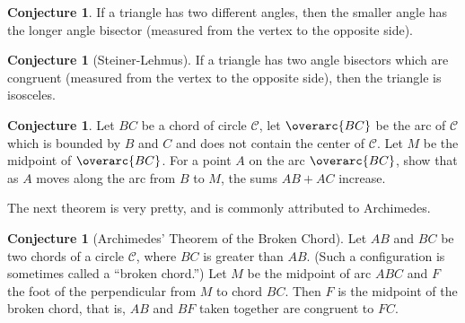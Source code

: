 \documentclass{tufte-handout}
\theoremstyle{definition}
\newtheorem{conjecture}[problem]{Conjecture}
\begin{document}
\begin{conjecture}
If a triangle has two different angles, then the smaller angle has the longer angle bisector (measured from the vertex to the opposite side).
\end{conjecture}

\begin{conjecture}[Steiner-Lehmus]
If a triangle has two angle bisectors which are congruent (measured from the vertex to the opposite side), then the triangle is isosceles.
\end{conjecture}

\begin{conjecture}
Let $BC$ be a chord of circle $\mathcal{C}$, let $\overarc{BC}$ be the arc of $\mathcal{C}$ which is bounded by $B$ and $C$ and does not contain the center of $\mathcal{C}$.
Let $M$ be the midpoint of $\overarc{BC}$.
For a point $A$ on the arc $\overarc{BC}$, show that as $A$ moves along the arc from $B$ to $M$, the sums $AB+AC$ increase.
\end{conjecture}


The next theorem is very pretty, and is commonly attributed to Archimedes.

\begin{conjecture}[Archimedes' Theorem of the Broken Chord] Let $AB$ and $BC$ be two chords of a circle $\mathcal{C}$, where $BC$ is greater than $AB$.
(Such a configuration is sometimes called a ``broken chord.'')
Let $M$ be the midpoint of arc ${ABC}$ and $F$ the foot of the perpendicular from $M$ to chord $BC$.
Then $F$ is the midpoint of the broken chord, that is, $AB$ and $BF$ taken together are congruent to $FC$.
\end{conjecture}

\vfill
\end{document}

